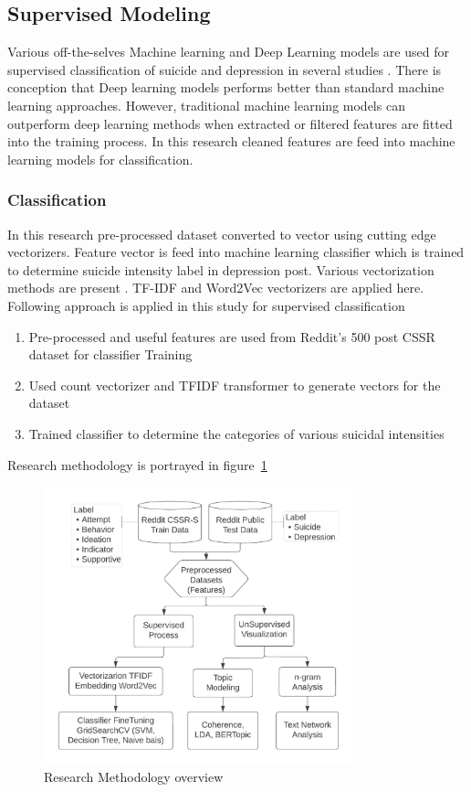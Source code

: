 \documentclass[sn-mathphys,Numbered]{sn-jnl}%
\theoremstyle{thmstyleone}%
\theoremstyle{thmstyletwo}%
\theoremstyle{thmstylethree}%
\begin{document}
\subsection{Supervised Modeling}
Various off-the-selves Machine learning and Deep Learning models are used for supervised classification of suicide and depression in several studies \cite{castillo2020suicide, chancellor2020methods, zhang2022natural}. 
There is conception that Deep learning models performs better than standard machine learning approaches. However, traditional machine learning models can outperform deep learning methods when extracted or filtered features are fitted into the training process. In this research cleaned features are feed into machine learning models for classification. 
\subsubsection{Classification}
In this research pre-processed dataset converted to vector using cutting edge vectorizers. Feature vector is feed into machine learning classifier which is trained to determine suicide intensity label in depression post. Various vectorization methods are present \cite{aldhyani2022detecting, wang2020depression, shetty2020predicting}. TF-IDF and Word2Vec vectorizers are applied here. Following approach is applied in this study for supervised classification
\begin{enumerate} [label=(\roman*)]
\item Pre-processed and useful features are used from Reddit's 500 post CSSR dataset for classifier Training
\item Used count vectorizer and TFIDF transformer to generate vectors for the dataset
\item Trained classifier to determine the categories of various suicidal intensities
\end{enumerate}
Research methodology is portrayed in figure~\ref{fig:res_diagram} 
\begin{figure}[h!]
\centering
\includegraphics[width=0.8\textwidth]{res_diagram.jpeg}
\caption{Research Methodology overview}
\label{fig:res_diagram}
\end{figure}
\end{document}
